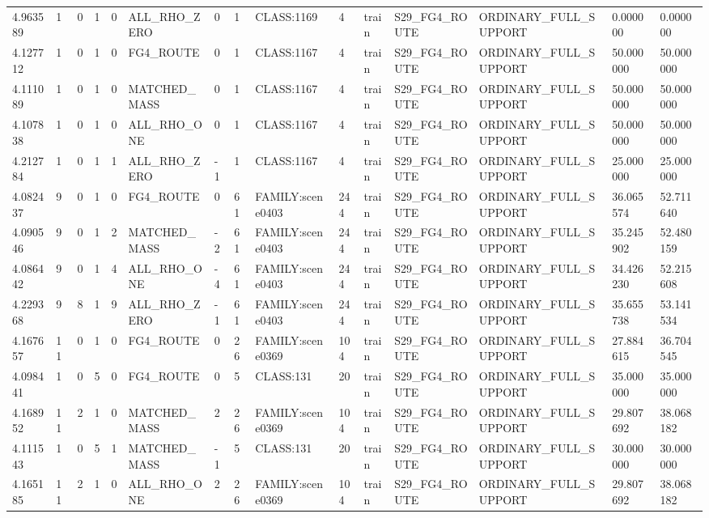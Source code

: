\begin{tabular}{lllllllllllllll}
4.963589 & 1 & 0 & 1 & 0 & ALL\_RHO\_ZERO & 0 & 1 & CLASS:1169 & 4 & train & S29\_FG4\_ROUTE & ORDINARY\_FULL\_SUPPORT & 0.000000 & 0.000000 \\
4.127712 & 1 & 0 & 1 & 0 & FG4\_ROUTE & 0 & 1 & CLASS:1167 & 4 & train & S29\_FG4\_ROUTE & ORDINARY\_FULL\_SUPPORT & 50.000000 & 50.000000 \\
4.111089 & 1 & 0 & 1 & 0 & MATCHED\_MASS & 0 & 1 & CLASS:1167 & 4 & train & S29\_FG4\_ROUTE & ORDINARY\_FULL\_SUPPORT & 50.000000 & 50.000000 \\
4.107838 & 1 & 0 & 1 & 0 & ALL\_RHO\_ONE & 0 & 1 & CLASS:1167 & 4 & train & S29\_FG4\_ROUTE & ORDINARY\_FULL\_SUPPORT & 50.000000 & 50.000000 \\
4.212784 & 1 & 0 & 1 & 1 & ALL\_RHO\_ZERO & -1 & 1 & CLASS:1167 & 4 & train & S29\_FG4\_ROUTE & ORDINARY\_FULL\_SUPPORT & 25.000000 & 25.000000 \\
4.082437 & 9 & 0 & 1 & 0 & FG4\_ROUTE & 0 & 61 & FAMILY:scene0403 & 244 & train & S29\_FG4\_ROUTE & ORDINARY\_FULL\_SUPPORT & 36.065574 & 52.711640 \\
4.090546 & 9 & 0 & 1 & 2 & MATCHED\_MASS & -2 & 61 & FAMILY:scene0403 & 244 & train & S29\_FG4\_ROUTE & ORDINARY\_FULL\_SUPPORT & 35.245902 & 52.480159 \\
4.086442 & 9 & 0 & 1 & 4 & ALL\_RHO\_ONE & -4 & 61 & FAMILY:scene0403 & 244 & train & S29\_FG4\_ROUTE & ORDINARY\_FULL\_SUPPORT & 34.426230 & 52.215608 \\
4.229368 & 9 & 8 & 1 & 9 & ALL\_RHO\_ZERO & -1 & 61 & FAMILY:scene0403 & 244 & train & S29\_FG4\_ROUTE & ORDINARY\_FULL\_SUPPORT & 35.655738 & 53.141534 \\
4.167657 & 11 & 0 & 1 & 0 & FG4\_ROUTE & 0 & 26 & FAMILY:scene0369 & 104 & train & S29\_FG4\_ROUTE & ORDINARY\_FULL\_SUPPORT & 27.884615 & 36.704545 \\
4.098441 & 1 & 0 & 5 & 0 & FG4\_ROUTE & 0 & 5 & CLASS:131 & 20 & train & S29\_FG4\_ROUTE & ORDINARY\_FULL\_SUPPORT & 35.000000 & 35.000000 \\
4.168952 & 11 & 2 & 1 & 0 & MATCHED\_MASS & 2 & 26 & FAMILY:scene0369 & 104 & train & S29\_FG4\_ROUTE & ORDINARY\_FULL\_SUPPORT & 29.807692 & 38.068182 \\
4.111543 & 1 & 0 & 5 & 1 & MATCHED\_MASS & -1 & 5 & CLASS:131 & 20 & train & S29\_FG4\_ROUTE & ORDINARY\_FULL\_SUPPORT & 30.000000 & 30.000000 \\
4.165185 & 11 & 2 & 1 & 0 & ALL\_RHO\_ONE & 2 & 26 & FAMILY:scene0369 & 104 & train & S29\_FG4\_ROUTE & ORDINARY\_FULL\_SUPPORT & 29.807692 & 38.068182 \\

\end{tabular}
